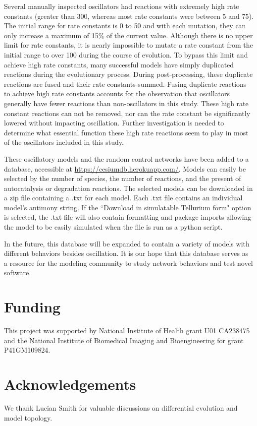 \documentclass[12pt]{report}
\begin{document}
Several manually inspected oscillators had reactions with extremely high rate constants (greater than 300, whereas most rate constants were between 5 and 75). The initial range for rate constants is 0 to 50 and with each mutation, they can only increase a maximum of 15\% of the current value. Although there is no upper limit for rate constants, it is nearly impossible to mutate a rate constant from the initial range to over 100 during the course of evolution. To bypass this limit and achieve high rate constants, many successful models have simply duplicated reactions during the evolutionary process. During post-processing, these duplicate reactions are fused and their rate constants summed. Fusing duplicate reactions to achieve high rate constants accounts for the observation that oscillators generally have fewer reactions than non-oscillators in this study. These high rate constant reactions can not be removed, nor can the rate constant be significantly lowered without impacting oscillation. Further investigation is needed to determine what essential function these high rate reactions seem to play in most of the oscillators included in this study. 


These oscillatory models and the random control networks have been added to a database, accessible at \url{https://cesiumdb.herokuapp.com/}. Models can easily be selected by the number of species, the number of reactions, and the present of autocatalysis or degradation reactions. The selected models can be downloaded in a zip file containing a .txt for each model. Each .txt file contains an individual model's antimony string. If the ``Download in simulatable Tellurium form" option is selected, the .txt file will also contain formatting and package imports allowing the model to be easily simulated when the file is run as a python script. 

In the future, this database will be expanded to contain a variety of models with different behaviors besides oscillation. It is our hope that this database serves as a resource for the modeling community to study network behaviors and test novel software.


\section*{Funding}
This project was supported by National Institute of Health grant U01 CA238475 and the National Institute of Biomedical Imaging and Bioengineering for grant P41GM109824.

\section*{Acknowledgements}
We thank Lucian Smith for valuable discussions on differential evolution and model topology. 
\\
\end{document}
